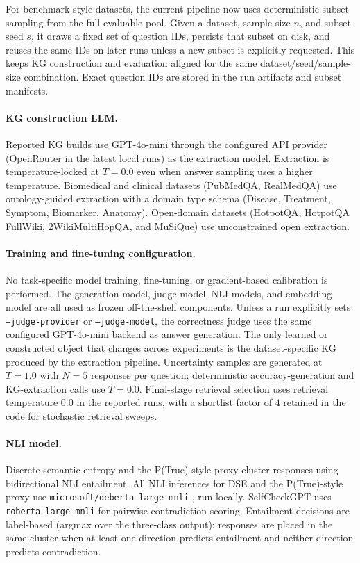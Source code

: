 For benchmark-style datasets, the current pipeline now uses deterministic
subset sampling from the full evaluable pool.
Given a dataset, sample size $n$, and subset seed $s$, it draws a fixed set
of question IDs, persists that subset on disk, and reuses the same IDs on
later runs unless a new subset is explicitly requested.
This keeps KG construction and evaluation aligned for the same
dataset/seed/sample-size combination.
Exact question IDs are stored in the run artifacts and subset manifests.

\paragraph{KG construction LLM.}
Reported KG builds use GPT-4o-mini through the configured API provider
(OpenRouter in the latest local runs) as the extraction model.
Extraction is temperature-locked at $T=0.0$ even when answer sampling uses a
higher temperature.
Biomedical and clinical datasets (PubMedQA, RealMedQA) use ontology-guided extraction
with a domain type schema (Disease, Treatment, Symptom, Biomarker, Anatomy).
Open-domain datasets (HotpotQA, HotpotQA FullWiki, 2WikiMultiHopQA, and MuSiQue) use
unconstrained open extraction.

\paragraph{Training and fine-tuning configuration.}
No task-specific model training, fine-tuning, or gradient-based calibration is
performed.
The generation model, judge model, NLI models, and embedding model are all
used as frozen off-the-shelf components.
Unless a run explicitly sets \texttt{--judge-provider} or
\texttt{--judge-model}, the correctness judge uses the same configured
GPT-4o-mini backend as answer generation.
The only learned or constructed object that changes across experiments is the
dataset-specific KG produced by the extraction pipeline.
Uncertainty samples are generated at $T=1.0$ with $N=5$ responses per
question; deterministic accuracy-generation and KG-extraction calls use
$T=0.0$.
Final-stage retrieval selection uses retrieval temperature $0.0$ in the
reported runs, with a shortlist factor of $4$ retained in the code for
stochastic retrieval sweeps.

\paragraph{NLI model.}
Discrete semantic entropy and the P(True)-style proxy cluster responses using
bidirectional NLI entailment.
All NLI inferences for DSE and the P(True)-style proxy use
\texttt{microsoft/deberta-large-mnli} \citep{he2021deberta}, run locally.
SelfCheckGPT uses \texttt{roberta-large-mnli} for pairwise contradiction
scoring.
Entailment decisions are label-based (argmax over the three-class output):
responses are placed in the same cluster when at least one direction predicts
entailment and neither direction predicts contradiction.

